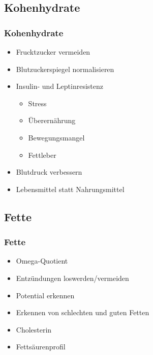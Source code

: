 \documentclass[xcolor=dvipsnames]{beamer}
\begin{document}
    \subsection{Kohenhydrate}
    \begin{frame}
        \frametitle{Kohenhydrate}
        \begin{itemize}
            \setlength\itemsep{1em}
            \item Frucktzucker vermeiden
            \item Blutzuckerspiegel normalisieren
            \item Insulin- und Leptinresistenz
            \begin{itemize}
                \item Stress
                \item Überernährung
                \item Bewegungsmangel
                \item Fettleber
            \end{itemize}
            \item Blutdruck verbessern
            \item Lebensmittel statt Nahrungsmittel
        \end{itemize}
    \end{frame}

    \subsection{Fette}
    \begin{frame}
        \frametitle{Fette}
        \begin{itemize}
            \setlength\itemsep{1em}
            \item Omega-Quotient
            \item Entzündungen loswerden/vermeiden
            \item Potential erkennen
            \item Erkennen von schlechten und guten Fetten
            \item Cholesterin
            \item Fettsäurenprofil
        \end{itemize}
    \end{frame}
\end{document}
